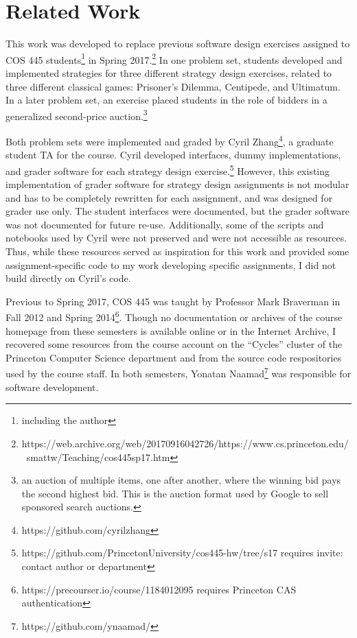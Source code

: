 \documentclass[pageno]{jpaper}
\begin{document}
\section*{Related Work}
This work was developed to replace previous software design exercises assigned to COS 445 students\footnote{including the author} in Spring 2017.\footnote{https://web.archive.org/web/20170916042726/https://www.cs.princeton.edu/~smattw/Teaching/cos445sp17.htm}
In one problem set, students developed and implemented strategies for three different strategy design exercises, related to three different classical games: Prisoner's Dilemma, Centipede, and Ultimatum.
In a later problem set, an exercise placed students in the role of bidders in a generalized second-price auction.\footnote{an auction of multiple items, one after another, where the winning bid pays the second highest bid. This is the auction format used by Google to sell sponsored search auctions.}

Both problem sets were implemented and graded by Cyril Zhang\footnote{https://github.com/cyrilzhang}, a graduate student TA for the course.
Cyril developed interfaces, dummy implementations, and grader software for each strategy design exercise.\footnote{https://github.com/PrincetonUniversity/cos445-hw/tree/s17 requires invite: contact author or department}
However, this existing implementation of grader software for strategy design assignments is not modular and has to be completely rewritten for each assignment, and was designed for grader use only.
The student interfaces were documented, but the grader software was not documented for future re-use.
Additionally, some of the scripts and notebooks used by Cyril were not preserved and were not accessible as resources.
Thus, while these resources served as inspiration for this work and provided some assignment-specific code to my work developing specific assignments, I did not build directly on Cyril's code.

Previous to Spring 2017, COS 445 was taught by Professor Mark Braverman in Fall 2012 and Spring 2014\footnote{https://precourser.io/course/1184012095 requires Princeton CAS authentication}.
Though no documentation or archives of the course homepage from these semesters is available online or in the Internet Archive, I recovered some resources from the course account on the ``Cycles'' cluster of the Princeton Computer Science department and from the source code respositories used by the course staff.
In both semesters, Yonatan Naamad\footnote{https://github.com/ynaamad/} was responsible for software development.
\end{document}
